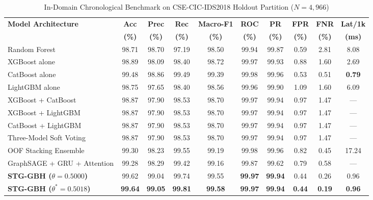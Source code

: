 \documentclass[11pt,a4paper]{article}
\begin{document}
\begin{table}[ht]
\centering
\vspace{-4pt}
\caption{In-Domain Chronological Benchmark on CSE-CIC-IDS2018 Holdout Partition ($N = 4,966$)}
\label{tab:in_domain_results}
\footnotesize
\renewcommand{\arraystretch}{0.92}
\setlength{\tabcolsep}{3.5pt}
\begin{tabularx}{\textwidth}{@{} >{\raggedright\arraybackslash}X ccccccccc @{}}
\toprule
\textbf{Model Architecture} & \textbf{Acc} & \textbf{Prec} & \textbf{Rec} & \textbf{Macro-F1} & \textbf{ROC} & \textbf{PR} & \textbf{FPR} & \textbf{FNR} & \textbf{Lat/1k} \\
& \textbf{(\%)} & \textbf{(\%)} & \textbf{(\%)} & \textbf{(\%)} & \textbf{(\%)} & \textbf{(\%)} & \textbf{(\%)} & \textbf{(\%)} & \textbf{(ms)} \\
\midrule
Random Forest & 98.71 & 98.70 & 97.19 & 98.50 & 99.94 & 99.87 & 0.59 & 2.81 & 8.08 \\
XGBoost alone & 98.89 & 98.09 & 98.40 & 98.72 & 99.97 & 99.93 & 0.88 & 1.60 & 2.69 \\
CatBoost alone & 99.48 & 98.86 & 99.49 & 99.39 & 99.98 & 99.96 & 0.53 & 0.51 & \textbf{0.79} \\
LightGBM alone & 98.75 & 97.65 & 98.40 & 98.56 & 99.96 & 99.90 & 1.09 & 1.60 & 6.09 \\
XGBoost + CatBoost & 98.87 & 97.90 & 98.53 & 98.70 & 99.97 & 99.94 & 0.97 & 1.47 & --- \\
XGBoost + LightGBM & 98.87 & 97.90 & 98.53 & 98.70 & 99.97 & 99.94 & 0.97 & 1.47 & --- \\
CatBoost + LightGBM & 98.87 & 97.90 & 98.53 & 98.70 & 99.97 & 99.94 & 0.97 & 1.47 & --- \\
Three-Model Soft Voting & 98.87 & 97.90 & 98.53 & 98.70 & 99.97 & 99.94 & 0.97 & 1.47 & --- \\
OOF Stacking Ensemble & 99.30 & 98.23 & 99.55 & 99.19 & 99.98 & 99.96 & 0.82 & 0.45 & 17.24 \\
GraphSAGE + GRU + Attention & 99.28 & 98.29 & 99.42 & 99.16 & 99.87 & 99.62 & 0.79 & 0.58 & --- \\
\textbf{STG-GBH ($\theta = 0.5000$)} & 99.62 & 99.04 & 99.74 & 99.55 & \textbf{99.97} & \textbf{99.94} & 0.44 & 0.26 & 0.96 \\
\textbf{STG-GBH ($\theta^* = 0.5018$)} & \textbf{99.64} & \textbf{99.05} & \textbf{99.81} & \textbf{99.58} & \textbf{99.97} & \textbf{99.94} & \textbf{0.44} & \textbf{0.19} & \textbf{0.96} \\
\bottomrule
\end{tabularx}
\end{table}
\end{document}
